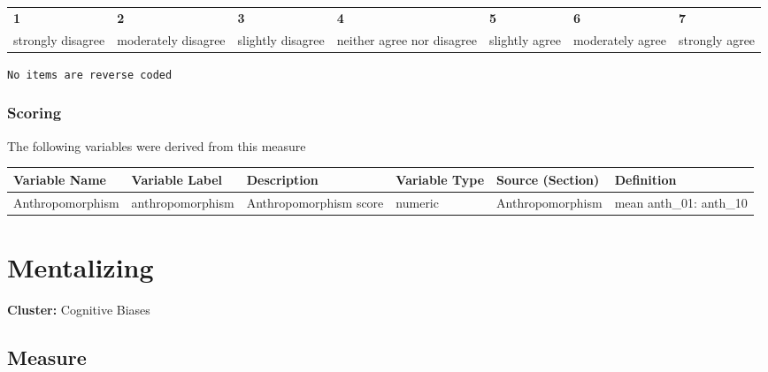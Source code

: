 \documentclass[
  letterpaper,
]{scrbook}
\begin{document}
\begin{longtable}[]{@{}
  >{\raggedright\arraybackslash}p{}
  >{\raggedright\arraybackslash}p{}
  >{\raggedright\arraybackslash}p{}
  >{\raggedright\arraybackslash}p{}
  >{\raggedright\arraybackslash}p{}
  >{\raggedright\arraybackslash}p{}
  >{\raggedright\arraybackslash}p{}@{}}
\toprule\noalign{}
\endhead
\bottomrule\noalign{}
\endlastfoot
\textbf{1} & \textbf{2} & \textbf{3} & \textbf{4} & \textbf{5} &
\textbf{6} & \textbf{7} \\
strongly disagree & moderately disagree & slightly disagree & neither
agree nor disagree & slightly agree & moderately agree & strongly
agree \\
\end{longtable}

\texttt{No\ items\ are\ reverse\ coded}

\subsection{Scoring}\label{scoring-9}

The following variables were derived from this measure

\begin{tabu} to 
\toprule
Variable Name & Variable Label & Description & Variable Type & Source (Section) & Definition\\
\midrule
Anthropomorphism & anthropomorphism & Anthropomorphism score & numeric & Anthropomorphism & mean anth\_01: anth\_10\\
\bottomrule
\end{tabu}

\chapter{Mentalizing}\label{mentalizing}

\textbf{Cluster:} Cognitive Biases

\section{Measure}\label{measure-10}
\end{document}
